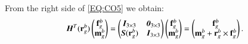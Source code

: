 From the right side of \ref{EQ:CO5} we obtain: 
\begin{align}
\emph{\textbf{H}}^{T}(\vec{r}_{g}^{b})
\begin{pmatrix}
\vec{f}^{b}_{g} \\
\vec{m}^{b}_{g}
\end{pmatrix}=
\begin{pmatrix}
\emph{\textbf{I}}_{3\times 3}&\emph{\textbf{0}}_{3\times 3} \\
\emph{\textbf{S}}(\vec{r}^{b}_{g})
&\emph{\textbf{I}}_{3\times 3}
\end{pmatrix}
\begin{pmatrix}
\vec{f}^{b}_{g} \\
\vec{m}^{b}_{g}
\end{pmatrix}=
\begin{pmatrix}
\vec{f}_{g}^{b}\\
\vec{m}_{g}^{b}+\vec{r}_{g}^{b}\times \vec{f}^{b}_{g}
\end{pmatrix}\label{EQ:Force1}.
\end{align} 

